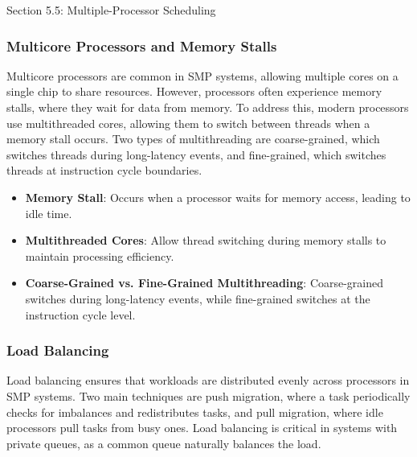 \begin{notes}{Section 5.5: Multiple-Processor Scheduling}
\begin{highlight}
    \end{highlight}
    
    \subsubsection*{Multicore Processors and Memory Stalls}
    
    Multicore processors are common in SMP systems, allowing multiple cores on a single chip to share resources. However, processors often experience memory stalls, where they wait for data from memory. 
    To address this, modern processors use multithreaded cores, allowing them to switch between threads when a memory stall occurs. Two types of multithreading are coarse-grained, which switches threads 
    during long-latency events, and fine-grained, which switches threads at instruction cycle boundaries.
    
    \begin{highlight}
    
        \begin{itemize}
            \item \textbf{Memory Stall}: Occurs when a processor waits for memory access, leading to idle time.
            \item \textbf{Multithreaded Cores}: Allow thread switching during memory stalls to maintain processing efficiency.
            \item \textbf{Coarse-Grained vs. Fine-Grained Multithreading}: Coarse-grained switches during long-latency events, while fine-grained switches at the instruction cycle level.
        \end{itemize}
    
    \end{highlight}
    
    \subsubsection*{Load Balancing}
    
    Load balancing ensures that workloads are distributed evenly across processors in SMP systems. Two main techniques are push migration, where a task periodically checks for imbalances and redistributes 
    tasks, and pull migration, where idle processors pull tasks from busy ones. Load balancing is critical in systems with private queues, as a common queue naturally balances the load.
    
    \begin{highlight}
    

\end{highlight}
\end{notes}
